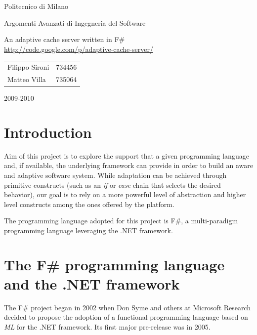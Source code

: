 \documentclass[11pt,a4paper]{article}
\begin{document}
\thispagestyle{empty}

\begin{center}
{\huge Politecnico di Milano}
\end{center}

\begin{center}
{\huge Argomenti Avanzati di Ingegneria del Software}
\end{center}

\vskip 8cm

\begin{center}
{\huge An adaptive cache server written in F\#}\\
\url{http://code.google.com/p/adaptive-cache-server/}
\end{center}

\vskip 2cm

\begin{center}
\begin{tabular}{ll}
{\large Filippo Sironi} & {\large 734456}\\
{\large Matteo Villa} & {\large 735064}\\
\end{tabular}
\end{center}

\vskip 5.5cm

\begin{center}
{\large 2009-2010}
\end{center}

\newpage

\section{Introduction}
\label{section:introduction}
Aim of this project is to explore the support that a given programming language and, if available, the underlying framework can provide in order to build an aware and adaptive software system.
While adaptation can be achieved through primitive constructs (such as an \emph{if} or \emph{case} chain that selects the desired behavior), our goal is to rely on a more powerful level of abstraction and higher level constructs among the ones offered by the platform.

The programming language adopted for this project is F\#, a multi-paradigm programming language leveraging the .NET framework.

\section{The F\# programming language and the .NET framework}
\label{section:platform}
The F\# project began in 2002 when Don Syme and others at Microsoft Research decided to propose the adoption of a functional programming language based on \emph{ML} for the .NET framework. Its first major pre-release was in 2005.
\end{document}
